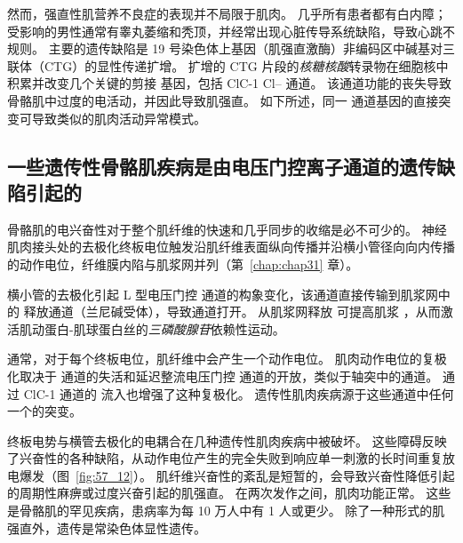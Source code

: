 然而，强直性肌营养不良症的表现并不局限于肌肉。
几乎所有患者都有白内障；
受影响的男性通常有睾丸萎缩和秃顶，并经常出现心脏传导系统缺陷，导致心跳不规则。
主要的遗传缺陷是 19 号染色体上基因（肌强直激酶）非编码区中碱基对三联体（CTG）的显性传递扩增。
扩增的 CTG 片段的\textit{核糖核酸}转录物在细胞核中积累并改变几个关键的剪接 基因，包括 ClC-1 Cl– 通道。
该通道功能的丧失导致骨骼肌中过度的电活动，并因此导致肌强直。
如下所述，同一  通道基因的直接突变可导致类似的肌肉活动异常模式。



\subsection{一些遗传性骨骼肌疾病是由电压门控离子通道的遗传缺陷引起的}

骨骼肌的电兴奋性对于整个肌纤维的快速和几乎同步的收缩是必不可少的。
神经肌肉接头处的去极化终板电位触发沿肌纤维表面纵向传播并沿横小管径向向内传播的动作电位，纤维膜内陷与肌浆网并列（第~\ref{chap:chap31} 章）。


横小管的去极化引起 L 型电压门控  通道的构象变化，该通道直接传输到肌浆网中的  释放通道（兰尼碱受体），导致通道打开。
从肌浆网释放  可提高肌浆 ，从而激活肌动蛋白-肌球蛋白丝的\textit{三磷酸腺苷}依赖性运动。


通常，对于每个终板电位，肌纤维中会产生一个动作电位。
肌肉动作电位的复极化取决于  通道的失活和延迟整流电压门控  通道的开放，类似于轴突中的通道。
通过 ClC-1  通道的  流入也增强了这种复极化。
遗传性肌肉疾病源于这些通道中任何一个的突变。


终板电势与横管去极化的电耦合在几种遗传性肌肉疾病中被破坏。
这些障碍反映了兴奋性的各种缺陷，从动作电位产生的完全失败到响应单一刺激的长时间重复放电爆发（图~\ref{fig:57_12}）。
肌纤维兴奋性的紊乱是短暂的，会导致兴奋性降低引起的周期性麻痹或过度兴奋引起的肌强直。
在两次发作之间，肌肉功能正常。
这些是骨骼肌的罕见疾病，患病率为每 10 万人中有 1 人或更少。
除了一种形式的肌强直外，遗传是常染色体显性遗传。


